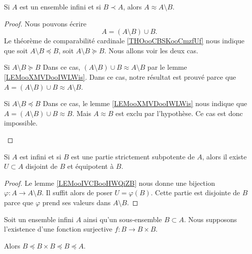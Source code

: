\begin{lemma}       \label{LEMooIVCBooHWQiZB}
    Si \( A\) est un ensemble infini et si \( B\prec A\), alors \( A\approx A\setminus B\).
\end{lemma}

\begin{proof}
    Nous pouvons écrire
    \begin{equation}
        A=(A\setminus B)\cup B.
    \end{equation}
    Le théorème de comparabilité cardinale \ref{THOooCBSKooCmzfUf} nous indique que soit \( A\setminus B\preceq B\), soit \( A\setminus B\succeq B\). Nous allons voir les deux cas.
    \begin{subproof}
        \item[Si \( A\setminus B\succeq B\)] 
            Dans ce cas, \( (A\setminus B)\cup B\approx A\setminus B\) par le lemme \ref{LEMooXMVDooIWLWis}. Dans ce cas, notre résultat est prouvé parce que \( A=(A\setminus B)\cup B\approx A\setminus B\).
        \item[Si \( A\setminus B\preceq B\)] 
            Dans ce cas, le lemme \ref{LEMooXMVDooIWLWis} nous indique que \( A=(A\setminus B)\cup B\approx B\). Mais \( A\approx B\) est exclu par l'hypothèse. Ce cas est donc impossible.
    \end{subproof}
\end{proof}

\begin{lemma}        \label{LEMooMRVQooUZSSyL}
    Si \( A\) est infini et si \( B\) est une partie strictement subpotente de \( A\), alors il existe \( U\subset A\) disjoint de \( B\) et équipotent à \( B\).
\end{lemma}

\begin{proof}
    Le lemme \ref{LEMooIVCBooHWQiZB} nous donne une bijection \( \varphi\colon A\to A\setminus B\). Il suffit alors de poser \( U=\varphi(B)\). Cette partie est disjointe de \( B\) parce que \( \varphi\) prend ses valeurs dans \( A\setminus B\).
\end{proof}

\begin{lemma}
    Soit un ensemble infini \( A\) ainsi qu'un sous-ensemble \( B\subset A\). Nous supposons l'existence d'une fonction surjective \( f\colon B\to B\times B\).

    Alors \( B\preceq B\times B\preceq B\preceq A\).
\end{lemma}


